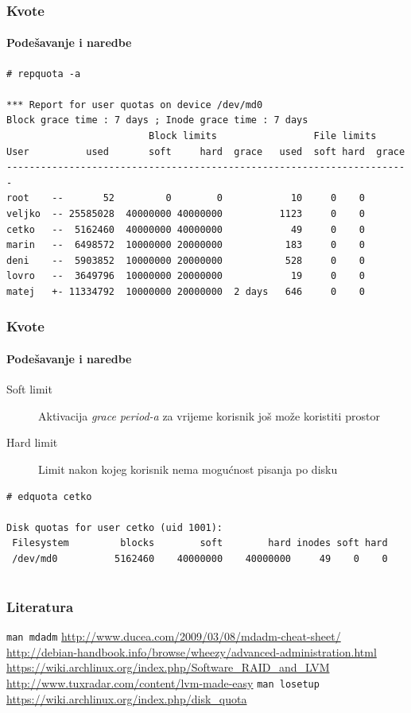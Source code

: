 \documentclass[t]{beamer}
\begin{document}
\begin{frame}[fragile]
	\frametitle{Kvote}
	\framesubtitle{Podešavanje i naredbe}
	{\footnotesize \begin{verbatim}
# repquota -a

*** Report for user quotas on device /dev/md0
Block grace time : 7 days ; Inode grace time : 7 days
                         Block limits                 File limits
User          used       soft     hard  grace   used  soft hard  grace
-----------------------------------------------------------------------
root    --       52         0        0            10     0    0
veljko  -- 25585028  40000000 40000000          1123     0    0
cetko   --  5162460  40000000 40000000            49     0    0
marin   --  6498572  10000000 20000000           183     0    0
deni    --  5903852  10000000 20000000           528     0    0
lovro   --  3649796  10000000 20000000            19     0    0
matej   +- 11334792  10000000 20000000  2 days   646     0    0
	\end{verbatim}}
\end{frame}

\begin{frame}[fragile]
	\frametitle{Kvote}
	\framesubtitle{Podešavanje i naredbe}
	\begin{description}
		\item[Soft limit] Aktivacija \emph{grace period-a} za vrijeme korisnik još može koristiti prostor
		\item[Hard limit] Limit nakon kojeg korisnik nema mogućnost pisanja po disku
	\end{description}
	\vspace{1em}
	{\footnotesize \begin{verbatim}
# edquota cetko

Disk quotas for user cetko (uid 1001):
 Filesystem         blocks        soft        hard inodes soft hard
 /dev/md0          5162460    40000000    40000000     49    0    0
	\end{verbatim}}
\end{frame}

\section*{}
\begin{frame}
	\frametitle{Literatura}
	\texttt{man mdadm}
	\url{http://www.ducea.com/2009/03/08/mdadm-cheat-sheet/}
	\vfill
	\url{http://debian-handbook.info/browse/wheezy/advanced-administration.html}\\
	\url{https://wiki.archlinux.org/index.php/Software_RAID_and_LVM}\\
	\url{http://www.tuxradar.com/content/lvm-made-easy}
	\vfill
	\texttt{man losetup}
	\vfill
	\url{https://wiki.archlinux.org/index.php/disk_quota}
\end{frame}
\end{document}
